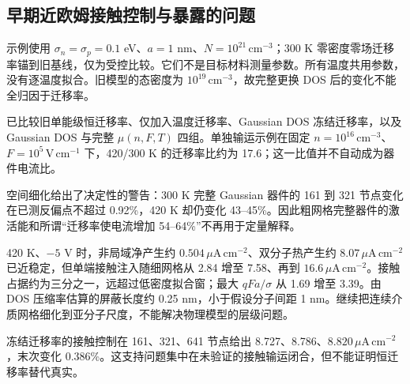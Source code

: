 \subsection{{\cjkfont 早期近欧姆接触控制与暴露的问题}\allowbreak{}}
{\cjkfont 示例使用}\allowbreak{} $\sigma_n=\sigma_p=0.1$ eV{\cjkfont 、}\allowbreak{}$a=1$ nm{\cjkfont 、}\allowbreak{}$N=10^{21}\,\mathrm{cm^{-3}}${\cjkfont ；}\allowbreak{}300 K {\cjkfont 零密度零场迁移率锚到旧基线，仅为受控比较。它们不是目标材料测量参数。所有温度共用参数，没有逐温度拟合。旧模型的态密度为}\allowbreak{} $10^{19}\,\mathrm{cm^{-3}}${\cjkfont ，故完整更换}\allowbreak{} DOS {\cjkfont 后的变化不能全归因于迁移率。}\allowbreak{}

{\cjkfont 已比较旧单能级恒迁移率、仅加入温度迁移率、}\allowbreak{}Gaussian DOS {\cjkfont 冻结迁移率，以及}\allowbreak{} Gaussian DOS {\cjkfont 与完整}\allowbreak{} $\mu(n,F,T)$ {\cjkfont 四组。单独输运示例在固定}\allowbreak{} $n=10^{16}\,\mathrm{cm^{-3}}${\cjkfont 、}\allowbreak{}$F=10^5\,\mathrm{V\,cm^{-1}}$ {\cjkfont 下，}\allowbreak{}420/300 K {\cjkfont 的迁移率比约为}\allowbreak{} 17.6{\cjkfont ；这一比值并不自动成为器件电流比。}\allowbreak{}

{\cjkfont 空间细化给出了决定性的警告：}\allowbreak{}300 K {\cjkfont 完整}\allowbreak{} Gaussian {\cjkfont 器件的}\allowbreak{} 161 {\cjkfont 到}\allowbreak{} 321 {\cjkfont 节点变化在已测反偏点不超过}\allowbreak{} 0.92\%{\cjkfont ，}\allowbreak{}420 K {\cjkfont 却仍变化}\allowbreak{} 43--45\%{\cjkfont 。因此粗网格完整器件的激活能和所谓}\allowbreak{}“{\cjkfont 迁移率使电流增加}\allowbreak{} 54--64\%”{\cjkfont 不再用于定量解释。}\allowbreak{}

420 K{\cjkfont 、}\allowbreak{}$-5$ V {\cjkfont 时，非局域净产生约}\allowbreak{} $0.504\,\mu\mathrm{A\,cm^{-2}}${\cjkfont 、双分子热产生约}\allowbreak{} $8.07\,\mu\mathrm{A\,cm^{-2}}$ {\cjkfont 已近稳定，但单端接触注入随细网格从}\allowbreak{} 2.84 {\cjkfont 增至}\allowbreak{} 7.58{\cjkfont 、再到}\allowbreak{} $16.6\,\mu\mathrm{A\,cm^{-2}}${\cjkfont 。接触占据约为三分之一，远超过低密度拟合窗；最大}\allowbreak{} $qFa/\sigma$ {\cjkfont 从}\allowbreak{} 1.69 {\cjkfont 增至}\allowbreak{} 3.39{\cjkfont 。由}\allowbreak{} DOS {\cjkfont 压缩率估算的屏蔽长度约}\allowbreak{} 0.25 nm{\cjkfont ，小于假设分子间距}\allowbreak{} 1 nm{\cjkfont 。继续把连续介质网格细化到亚分子尺度，不能解决物理模型的层级问题。}\allowbreak{}

{\cjkfont 冻结迁移率的接触控制在}\allowbreak{} 161{\cjkfont 、}\allowbreak{}321{\cjkfont 、}\allowbreak{}641 {\cjkfont 节点给出}\allowbreak{} 8.727{\cjkfont 、}\allowbreak{}8.786{\cjkfont 、}\allowbreak{}$8.820\,\mu\mathrm{A\,cm^{-2}}${\cjkfont ，末次变化}\allowbreak{} 0.386\%{\cjkfont 。这支持问题集中在未验证的接触输运闭合，但不能证明恒迁移率替代真实。}\allowbreak{}

